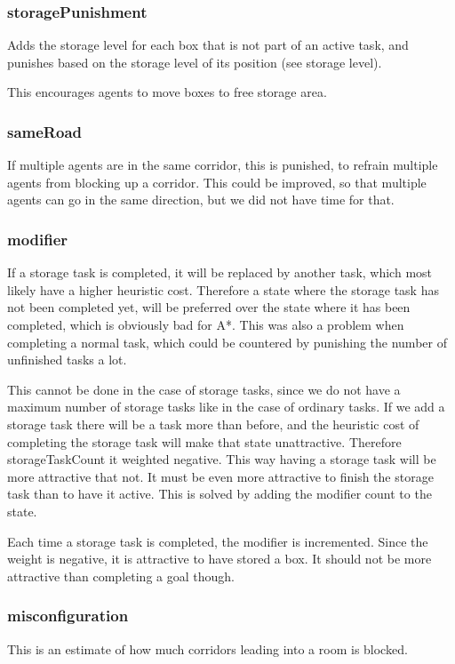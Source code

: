 \documentclass[letterpaper]{article}
\begin{document}
\subsubsection{storagePunishment}
Adds the storage level for each box that is not part of an active task, and
punishes based on the storage level of its position (see storage level).

This encourages agents to move boxes to free storage area.

\subsubsection{sameRoad}
If multiple agents are in the same corridor, this is punished, to refrain multiple
agents from blocking up a corridor. This could be improved, so that multiple agents
can go in the same direction, but we did not have time for that.

\subsubsection{modifier}
If a storage task is completed, it will be replaced by another task, which most likely
have a higher heuristic cost. Therefore a state where the storage task has not been completed
yet, will be preferred over the state where it has been completed, which is obviously bad
for A*. This was also a problem when completing a normal task, which could be countered
by punishing the number of unfinished tasks a lot.

This cannot be done in the case of storage tasks, since we do not have a maximum number of
storage tasks like in the case of ordinary tasks. If we add a storage task there will be
a task more than before, and the heuristic cost of completing the storage task will make that
state unattractive. Therefore storageTaskCount it weighted negative. This way having a storage
task will be more attractive that not. It must be even more attractive to finish the storage
task than to have it active. This is solved by adding the modifier count to the state.

Each time a storage task is completed, the modifier is incremented. Since the weight is
negative, it is attractive to have stored a box. It should not be more attractive than
completing a goal though.

\subsubsection{misconfiguration}
This is an estimate of how much corridors leading into a room is blocked.
\end{document}
